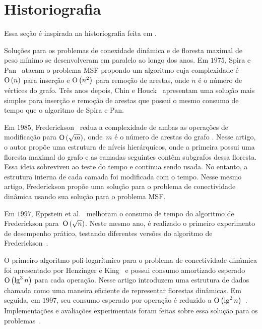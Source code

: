 \section{Historiografia}

Essa seção é inspirada na historiografia feita em \cite{QC22, HHSRecentAdvances2022, bruceM}.

Soluções para os problemas de conexidade dinâmica e de floresta maximal de peso mínimo se desenvolveram em paralelo ao longo dos anos. Em $1975$, Spira e Pan~\cite{SP1975} atacam o problema MSF propondo um algoritmo cuja complexidade é $\text{O}\left(n\right)$ para inserção e $\text{O}\left(n^2\right)$ para remoção de arestas, onde $n$ é o número de vértices do grafo. Três anos depois, Chin e Houck~\cite{CH1978} apresentam uma solução mais simples para inserção e remoção de arestas que possui o mesmo consumo de tempo que o algoritmo de Spira e Pan.

Em $1985$, Frederickson~\cite{frederickson1983data} reduz a complexidade de ambas as operações de modificação para $\text{O}\left(\sqrt{m}\right)$, onde~$m$ é o número de arestas do grafo .
Nesse artigo, o autor propõe uma estrutura de níveis hierárquicos, onde a primeira possui uma floresta maximal do grafo e as camadas seguintes contêm subgrafos dessa floresta.
Essa ideia sobreviveu ao teste do tempo e continua sendo usada. 
No entanto, a estrutura interna de cada camada foi modificada com o tempo. Nesse mesmo artigo, Frederickson propõe uma solução para o problema de conectividade dinâmica usando sua solução para o problema MSF.

Em $1997$, Eppstein et al.~\cite{Eppstein1992SparsificationaTF} melhoram o consumo de tempo do algoritmo de Frederickson para~$\text{O}\left(\sqrt{n}\right)$. Neste mesmo ano, é realizado o primeiro experimento de desempenho prático, testando diferentes versões do algoritmo de Frederickson~\cite{xpAnalyGiuseppe}.

O primeiro algoritmo poli-logarítmico para o problema de conectividade dinâmica foi apresentado por Henzinger e King~\cite{HenzingerKing} e possui consumo amortizado esperado $\text{O}\left(\lg^3 n\right)$ para cada operação. Nesse artigo introduzem uma estrutura de dados chamada  como uma maneira eficiente de representar florestas dinâmicas. Em seguida, em $1997$, seu consumo esperado por operação é reduzido a $\text{O}\left(\lg^2 n\right)$~\cite{HenzingerThorup}.  Implementações e avaliações experimentais foram feitas sobre essa solução para os problemas~\cite{EmpiricalStudy1997, EmpiricalStudy2002, Zaroliagis2002}.

